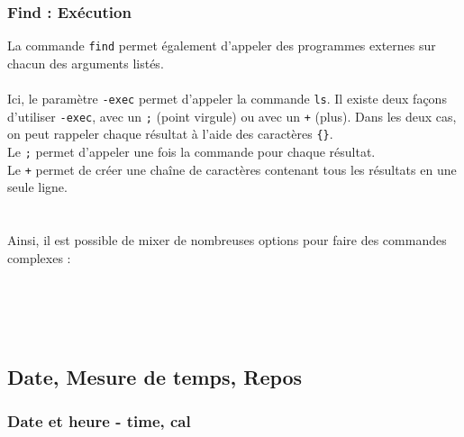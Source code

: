 \subsubsection{Find : Exécution}

\bigskip

La commande \texttt{find} permet également d'appeler des programmes externes sur chacun des arguments listés.\\

\\

Ici, le paramètre \texttt{-exec} permet d'appeler la commande \texttt{ls}.
Il existe deux façons d'utiliser \texttt{-exec}, avec un \texttt{;} (point virgule) ou avec un \texttt{+} (plus).
Dans les deux cas, on peut rappeler chaque résultat à l'aide des caractères \texttt{\{\}}.\\
Le \texttt{;} permet d'appeler une fois la commande pour chaque résultat.\\
Le \texttt{+} permet de créer une chaîne de caractères contenant tous les résultats en une seule ligne.\\

\\
\\

Ainsi, il est possible de mixer de nombreuses options pour faire des commandes complexes :\\

\\
\\
\\
\\



\newpage %
\subsection{Date, Mesure de temps, Repos}

\subsubsection{Date et heure - time, cal}

